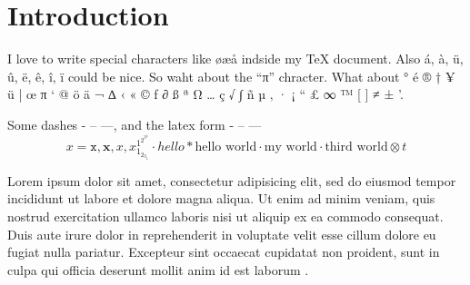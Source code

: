 \chapter{Introduction}

I love to write special characters like øæå indside my \TeX{} document. Also á, à, ü, û, ë, ê, î, ï could be nice. So waht about the ``π'' chracter. What about ° é ® † ¥ ü | œ π ‘ @ ö ä ¬ ∆ ‹ « © ƒ ∂ ß ª Ω … ç √ ∫ ñ µ ‚ · ¡ “ £ ∞ ™ [ ] ≠ ± '.

Some dashes - – —, and the latex form - -- ---
\begin{equation*}
    x = \mathtt{x}, \mathbf{x}, \mathit{x}, x_{1_{2_{3_{4}}}}^{1^{2^{3^{4}}}} \cdot hello * \text{hello world} ⋅ \text{my world} · \text{third world} ⊗ t
\end{equation*}

Lorem ipsum dolor sit amet, consectetur adipisicing elit, sed do eiusmod tempor incididunt ut labore et dolore magna aliqua. Ut enim ad minim veniam, quis nostrud exercitation ullamco laboris nisi ut aliquip ex ea commodo consequat. Duis aute irure dolor in reprehenderit in voluptate velit esse cillum dolore eu fugiat nulla pariatur. Excepteur sint occaecat cupidatat non proident, sunt in culpa qui officia deserunt mollit anim id est laborum \cite{adams1980hitchhiker}.

